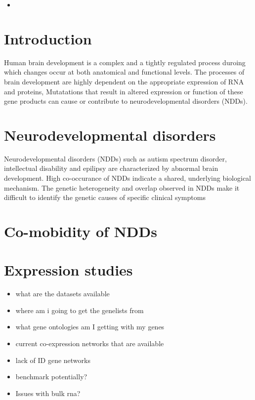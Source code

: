 \documentclass[12pt]{article}
\begin{document}
\begin{itemize}
    \item 
\end{itemize}

\section{Introduction}
Human brain development is a complex and a tightly regulated process duroing which changes occur at both anatomical and functional levels.
The processes of brain development are highly dependent on the appropriate expression of RNA and proteins, 
Mutatations that result in altered expression or function of these gene products can cause or contribute to neurodevelopmental disorders (NDDs). 
\begin{itemize}
    
\end{itemize}


\section{Neurodevelopmental disorders}

Neurodevelopmental disorders (NDDs) such as autism spectrum disorder, intellectual disability and epilipsy are characterized by abnormal brain development.
High co-occurance of NDDs indicate a shared, underlying biological mechanism. 
The genetic heterogeneity and overlap observed in NDDs make it difficult to identify the genetic causes of specific clinical symptoms
\section{Co-mobidity of NDDs}
\section{Expression studies}
\begin{itemize}

 \item what are the datasets available 
\item where am i going to get the genelists from 
\item what gene ontologies am I getting with my genes 
\item current co-expression networks that are available
\item lack of ID gene networks 
\item benchmark potentially?
\item Issues with bulk rna? 

\end{itemize}
\end{document}

